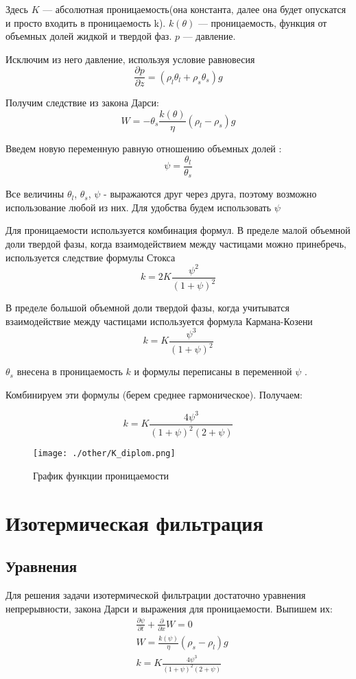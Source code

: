 \documentclass[12pt,a4paper]{article}
\newcommand{\pd}[2]{\frac{\partial #1}{\partial #2}}
\begin{document}
Здесь $ K $ --- абсолютная проницаемость(она константа, далее она будет опускатся и просто входить в проницаемость k). $k(\theta)$ --- проницаемость, функция от объемных долей жидкой и твердой фаз. $p$ --- давление. 

Исключим из него давление, используя условие равновесия
$$
\pd{p}{z} = (\rho_l \theta_l + \rho_s \theta_s)g
$$

Получим следствие из закона Дарси:
\begin{equation}
W= -\theta_s \frac{k(\theta)}{\eta}(\rho_l-\rho_s)g
\label{Darsi_new}
\end{equation}

Введем новую переменную равную отношению объемных долей : 
$$
\psi = \frac{\theta_l}{\theta_s} 
$$

Все величины $\theta_l $, $\theta_s $, $\psi $ - выражаются друг через друга, поэтому возможно использование любой из них. Для удобства будем использовать $\psi$

Для проницаемости используется комбинация формул. В пределе малой объемной доли твердой фазы, когда взаимодействием между частицами можно принебречь, используется следствие формулы Стокса 
$$
k = 2 K\frac{\psi^2}{(1+\psi)^2} 
$$

В пределе большой объемной доли твердой фазы, когда учитыватся взаимодействие между частицами используется формула Кармана-Козени 
$$
k = K\frac{\psi^3}{(1+\psi)^2}
$$

$\theta_s $ внесена в проницаемость $k$ и формулы переписаны в переменной $\psi$ . 

Комбинируем эти формулы (берем среднее гармоническое). Получаем:

\begin{equation}
k = K \frac{4\psi^3}{(1+\psi)^2(2+\psi)}
\label{permability}
\end{equation}

\begin{figure}[h!]
\begin{center}
\texttt{[image: ./other/K\_diplom.png]}
\caption{График функции проницаемости}
\end{center}
\end{figure}
\newpage
\section{Изотермическая фильтрация}
\subsection{Уравнения}
Для решения задачи изотермической фильтрации достаточно уравнения непрерывности, закона Дарси и выражения для проницаемости. Выпишем их:
\begin{equation}
\begin{aligned}
&\pd{\psi}{t} + \pd{}{x}W = 0\\
&W= \frac{k(\psi)}{\eta}(\rho_s-\rho_l)g\\
&k = K \frac{4\psi^3}{(1+\psi)^2(2+\psi)}\\
\label{isotermal}
\end{aligned}
\end{equation}
\end{document}
